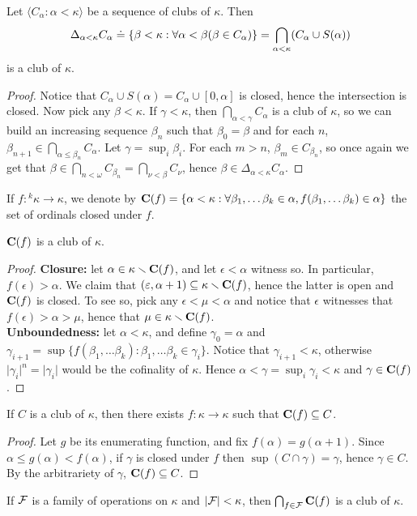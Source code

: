 \documentclass[twoside,openright,titlepage,numbers=noenddot,%
               headinclude,footinclude,cleardoublepage=empty,abstract=on,
               BCOR=23mm,paper=letter,fontsize=11pt
               ]{scrreprt}
\begin{document}
\begin{theorem}
    Let $\langle C_\alpha: \alpha < \kappa \rangle$ be a sequence of clubs of $\kappa$. Then
    \[ \Delta_{\alpha < \kappa} C_\alpha \hskip1mm\dot{=}\hskip1mm \{ \beta < \kappa: \forall \alpha < \beta(\beta \in C_\alpha)\} = \bigcap_{\alpha < \kappa} (C_\alpha \cup S(\alpha)) \]
    is a club of $\kappa$.
\end{theorem}
\begin{proof}
    Notice that $C_\alpha \cup S(\alpha) = C_\alpha \cup [0, \alpha]$ is closed, hence the intersection is closed.
    Now pick any $\beta < \kappa$. If $\gamma < \kappa$, then $\bigcap_{\alpha < \gamma} C_\alpha$ is a club of $\kappa$, so we can build an increasing sequence $\beta_n$ such that $\beta_0 = \beta$ and for each $n$, $\beta_{n+1} \in \bigcap_{\alpha \leq \beta_n} C_\alpha$. Let $\gamma = \sup_{i}\beta_i$. For each $m > n$, $\beta_m \in C_{\beta_n}$, so once again we get that $\beta \in \bigcap_{n < \omega} C_{\beta_n} = \bigcap_{\nu < \beta} C_\nu$, hence $\beta \in \Delta_{\alpha < \kappa} C_\alpha$.
\end{proof}
If $f: {}^k \kappa \to \kappa$, we denote by $\mathbf{C}(f) = \{\alpha < \kappa: \forall \beta_1, \dots \beta_k \in \alpha, f(\beta_1,\dots\beta_k) \in \alpha\}$ the set of ordinals closed under $f$.
\begin{proposition}
    $\mathbf{C}(f)$ is a club of $\kappa$.
\end{proposition}
\begin{proof}
    \textbf{Closure:} let $\alpha \in \kappa \smallsetminus \mathbf{C}(f)$, and let $\epsilon < \alpha$ witness so. In particular, $f(\epsilon) > \alpha$. We claim that $(\varepsilon, \alpha+1) \subseteq \kappa \smallsetminus \mathbf{C}(f)$, hence the latter is open and $\mathbf{C}(f)$ is closed. To see so, pick any $\epsilon < \mu < \alpha$ and notice that $\epsilon$ witnesses that $f(\epsilon) > \alpha > \mu$, hence that $\mu \in \kappa \smallsetminus \mathbf{C}(f)$. \\
    \textbf{Unboundedness:} let $\alpha < \kappa$, and define $\gamma_0 = \alpha$ and $\gamma_{i+1} = \sup\{f(\beta_1, \dots \beta_k): \beta_1, \dots \beta_k \in \gamma_i\}$. Notice that $\gamma_{i+1} < \kappa$, otherwise $\vert \gamma_i \vert^n = \vert \gamma_i \vert$ would be the cofinality of $\kappa$. Hence $\alpha < \gamma = \sup_{i} \gamma_i < \kappa$ and $\gamma \in \mathbf{C}(f)$.
\end{proof}
\begin{proposition}
    If $C$ is a club of $\kappa$, then there exists $f: \kappa \to \kappa$ such that $\mathbf{C}(f) \subseteq C$.
\end{proposition}
\begin{proof}
    Let $g$ be its enumerating function, and fix $f(\alpha) = g(\alpha+1)$. Since $\alpha \leq g(\alpha) < f(\alpha)$, if $\gamma$ is closed under $f$ then $\sup(C \cap \gamma) = \gamma$, hence $\gamma \in C$. By the arbitrariety of $\gamma$, $\mathbf{C}(f) \subseteq C$.
\end{proof}
\begin{corollary}
    If $\mathcal{F}$ is a family of operations on $\kappa$ and $\vert \mathcal{F} \vert < \kappa$, then $\bigcap_{f \in \mathcal{F}} \mathbf{C}(f)$ is a club of $\kappa$.
\end{corollary}
\end{document}
